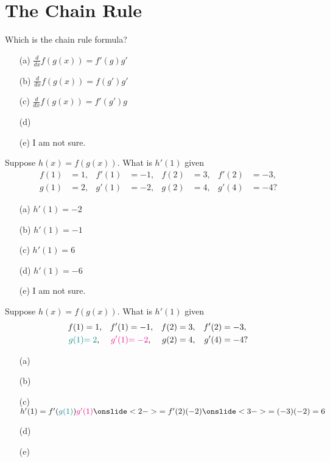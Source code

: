 \documentclass[14pt]{beamer}
\begin{document}
\section{The Chain Rule}
\begin{frame}
  Which is the chain rule formula?

  \medskip
  \begin{itemize} \setlength\itemsep{2ex}
    \item[(a)] \(\tfrac{d}{dx} f(g(x)) = f'(g)g'\)
    \item[(b)] \(\tfrac{d}{dx} f(g(x)) = f(g')g'\)
    \item[(c)] \(\tfrac{d}{dx} f(g(x)) = f'(g')g\)
    \item[(d)] 
    \item[(e)] I am not sure.
  \end{itemize} 
\end{frame}

\begin{frame}
  Suppose \(h(x) = f(g(x))\). What is \(h'(1)\) given
  \begin{align*}
    f(1) &= 1,& f'(1) &= -1, &f(2) &= 3, & f'(2) &= -3, \\
    g(1) &= 2,& g'(1) &= -2, &g(2) &= 4, & g'(4) &= -4?
  \end{align*}

  \medskip
  \begin{itemize} \setlength\itemsep{2ex}
    \item[(a)] \(h'(1) = -2\)
    \item[(b)] \(h'(1) = -1\)
    \item[(c)] \(h'(1) = 6\)
    \item[(d)] \(h'(1) = -6\)
    \item[(e)] I am not sure.
  \end{itemize} 
\end{frame}

\begin{frame}
  Suppose \(h(x) = f(g(x))\). What is \(h'(1)\) given
  \begin{align*}
    f(1) &= 1,& f'(1) &= -1, &f(2) &= 3, & f'(2) &= -3, \\
    {\color{teal}g(1)} &{\color{teal}= 2},& {\color{magenta}g'(1)} &{\color{magenta}= -2}, &g(2) &= 4, & g'(4) &= -4?
  \end{align*}

  \medskip
  \begin{itemize} \setlength\itemsep{2ex}
    \item[(a)] 
    \item[(b)] 
    \item[(c)] \(h'(1) = f'({\color{teal}g(1)}){\color{magenta}g'(1)} \onslide<2->{= f'(2)(-2)} \onslide<3->{= (-3)(-2) = 6}\)
    \item[(d)] 
    \item[(e)] 
  \end{itemize} 
\end{frame}
\end{document}
